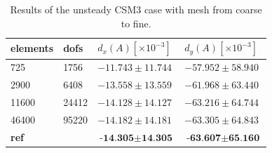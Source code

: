 \begin{table}[H]
\centering
\caption{Results of the unsteady CSM3 case with mesh from coarse to fine.}
\label{tab:CSM3}
\begin{tabular}{|l|l|l|l|}
\hline
elements & dofs & $d_x(A) [\times10^{-3}]$ & $d_y(A)[\times10^{-3}]$ \\ \hline
725 & 1756 & $-11.743 \pm 11.744$ & $-57.952 \pm 58.940$ \\ \hline
2900 & 6408 & $-13.558 \pm 13.559$ & $ -61.968 \pm  63.440 $ \\ \hline
11600 & 24412 & $ -14.128 \pm 14.127$ & $-63.216 \pm 64.744 $ \\ \hline
46400 & 95220 & $ -14.182 \pm 14.181 $ & $ -63.305 \pm 64.843 $ \\ \hline
\textbf{ref} &  & $ \textbf{-14.305} \pm \textbf{14.305} $ & $ \textbf{-63.607} \pm  \textbf{65.160} $ \\ \hline
\end{tabular}
\end{table}


